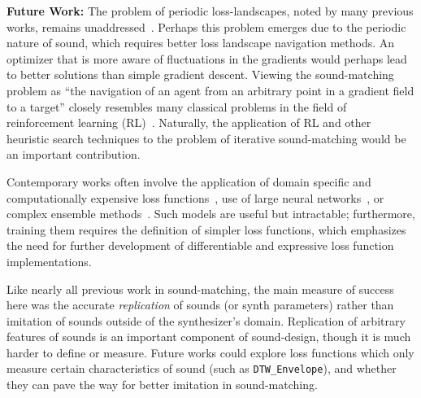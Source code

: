 \documentclass[lettersize,journal]{IEEEtran}
\newcommand{\DTWEnv}{\texttt{DTW\_Envelope}}
\providecommand{\DIFaddbegin}{} %
\providecommand{\DIFaddend}{} %
\providecommand{\DIFdelbegin}{} %
\providecommand{\DIFdelend}{} %
\providecommand{\DIFscaledelfig}{0.5}
\newlength{\DIFdelgraphicswidth} %
\newlength{\DIFdelgraphicsheight} %
\providecommand{\DIFaddincludegraphics}[2][]{{\color{blue}\fbox{\DIFOincludegraphics[#1]{#2}}}} %
\providecommand{\DIFdelincludegraphics}[2][]{%
\sbox{\DIFdelgraphicsbox}{\DIFOincludegraphics[#1]{#2}}%
\settoboxwidth{\DIFdelgraphicswidth}{\DIFdelgraphicsbox} %
\settoboxtotalheight{\DIFdelgraphicsheight}{\DIFdelgraphicsbox} %
\scalebox{\DIFscaledelfig}{%
\parbox[b]{\DIFdelgraphicswidth}{\usebox{\DIFdelgraphicsbox}\\[-\baselineskip] \rule{\DIFdelgraphicswidth}{0em}}\llap{\resizebox{\DIFdelgraphicswidth}{\DIFdelgraphicsheight}{%
\setlength{\unitlength}{\DIFdelgraphicswidth}%
\begin{picture}(1,1)%
\thicklines\linethickness{2pt} %
{\color[rgb]{1,0,0}\put(0,0){\framebox(1,1){}}}%
{\color[rgb]{1,0,0}\put(0,0){\line( 1,1){1}}}%
{\color[rgb]{1,0,0}\put(0,1){\line(1,-1){1}}}%
\end{picture}%
}\hspace*{3pt}}} %
} %
\DeclareRobustCommand{\DIFaddbegin}{\DIFOaddbegin \let\includegraphics\DIFaddincludegraphics} %
\DeclareRobustCommand{\DIFaddend}{\DIFOaddend \let\includegraphics\DIFOincludegraphics} %
\DeclareRobustCommand{\DIFdelbegin}{\DIFOdelbegin \let\includegraphics\DIFdelincludegraphics} %
\DeclareRobustCommand{\DIFdelend}{\DIFOaddend \let\includegraphics\DIFOincludegraphics} %
\begin{document}
\label{sec:future}
\textbf{Future Work: } The problem of periodic loss-landscapes, noted by many previous works, remains unaddressed~\cite{turian2020sorry,vahidi2023mesostructures,uzrad2024diffmoog,bruford2024synthesizer}. Perhaps this problem emerges due to the periodic nature of sound, which requires better loss landscape navigation methods. An optimizer that is more aware of fluctuations in the gradients would perhaps lead to better solutions than simple gradient descent. Viewing the sound-matching problem as ``the navigation of an agent from an arbitrary point in a gradient field to a target'' closely resembles many classical problems in the field of reinforcement learning (RL)~\cite{sutton2018reinforcement}. Naturally, the application of RL and other heuristic search techniques to the problem of iterative sound-matching would be an important contribution.

Contemporary works often involve the application of domain specific and computationally expensive loss functions~\cite{han2023perceptual,uzrad2024diffmoog}, use of large neural networks~\cite{hershey2017cnn,cramer2019look}, or complex ensemble methods~\cite{turian2022hear}. Such models are useful but intractable; furthermore, training them requires the definition of simpler loss functions, which emphasizes the need for further development of differentiable and expressive loss function implementations. 

Like nearly all previous work in sound-matching, the main measure of success here was the accurate \textit{replication} of sounds (or synth parameters) rather than imitation of sounds outside of the synthesizer's domain. Replication of arbitrary features of sounds is an important component of sound-design, though it is much harder to define or measure. Future works could explore loss functions which only measure certain characteristics of sound (such as \DTWEnv), and whether they can pave the way for better imitation in sound-matching.


\DIFdelbegin %
\DIFdelend %

\DIFaddbegin 

 \DIFaddend
\end{document}
